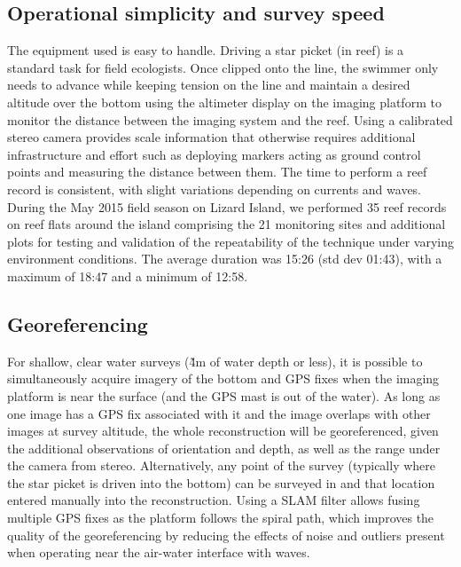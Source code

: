 \subsection{Operational simplicity and survey speed}
The equipment used is easy to handle. Driving a star picket (in reef) is a standard task for field ecologists. Once clipped onto the line, the swimmer only needs to advance while keeping tension on the line and maintain a desired altitude over the bottom using the altimeter display on the imaging platform to monitor the distance between the imaging system and the reef.  
Using a calibrated stereo camera provides scale information that otherwise requires additional infrastructure and effort such as deploying markers acting as ground control points and measuring the distance between them. 
The time to perform a reef record is consistent, with slight variations depending on currents and waves. During the May 2015 field season on Lizard Island, we performed 35 reef records on reef flats around the island comprising the 21 monitoring sites and additional plots for testing and validation of the repeatability of the technique under varying environment conditions. The average duration was 15:26 (std dev 01:43), with a maximum of 18:47 and a minimum of 12:58. 





\subsection{Georeferencing}
For shallow, clear water surveys (\~4m of water depth or less), it is possible to simultaneously acquire imagery of the bottom and GPS fixes when the imaging platform is near the surface (and the GPS mast is out of the water). As long as one image has a GPS fix associated with it and the image overlaps with other images at survey altitude, the whole reconstruction will be georeferenced, given the additional observations of orientation and depth, as well as the range under the camera from stereo. Alternatively, any point of the survey (typically where the star picket is driven into the bottom) can be surveyed in and that location entered manually into the reconstruction. Using a SLAM filter allows fusing multiple GPS fixes as the platform follows the spiral path, which improves the quality of the georeferencing by reducing the effects of noise and outliers present when operating near the air-water interface with waves.

